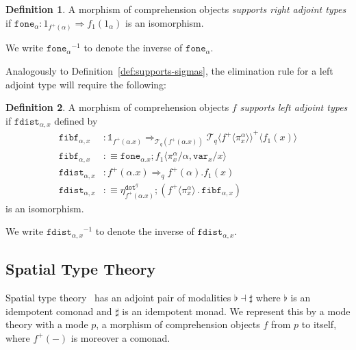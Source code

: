 \documentclass[10pt]{article}
\theoremstyle{definition}
\newtheorem{definition}{Definition}
\let\emptyset\varnothing
\newcommand{\tcell}{\Rightarrow}
\newcommand\TrPlus[2]{\ensuremath{{#1}^+(#2)}}
\newcommand\El[2]{\mathcal{T}_{#1}(#2)}
\newcommand\ApEl[2]{\mathcal{T}_{#1}\langle#2\rangle}
\newcommand\bdot[0]{\mathbin{.}}
\newcommand\ap[2]{\ensuremath{#1 \langle #2 \rangle }}
\newcommand\ApPlus[2]{\ensuremath{{#1}^+ \langle #2 \rangle }}
\newcommand{\tdot}{\ensuremath{\mathtt{dot}}}
\newcommand\One{\ensuremath{\mathds{1}}}
\newcommand\var[1]{\ensuremath{\mathtt{var}_{#1}}}
\newcommand\fone[1]{\ensuremath{\mathtt{fone}_{#1}}}
\newcommand\fibf[1]{\ensuremath{\mathtt{fibf}_{#1}}}
\newcommand\foneinv[1]{\ensuremath{\fone{#1}^{-1}}}
\newcommand\fdist[1]{\ensuremath{\mathtt{fdist}_{#1}}}
\newcommand\fdistinv[1]{\ensuremath{\fdist{#1}^{-1}}}
\begin{document}
\begin{definition} \label{def:supports-right-adjoint}
A morphism of comprehension objects \emph{supports right adjoint types}
if $\fone{\alpha} : 1_{\TrPlus{f}{\alpha}} \tcell f_1(1_\alpha)$ is an isomorphism.
\end{definition}
We write $\foneinv{\alpha}$ to denote the inverse of $\fone{\alpha}$.

Analogously to Definition~\ref{def:supports-sigmas}, the elimination
rule for a left adjoint type will require the following:

\begin{definition} \label{def:supports-left}
A morphism of comprehension objects $f$ \emph{supports left adjoint types} if $\fdist{\alpha, x}$ defined by
\begin{align*}
\fibf{\alpha, x} &: \One_{\TrPlus{f}{\alpha.x}} \tcell_{\El{q}{\TrPlus{f}{\alpha.x}}} \ApPlus{\ApEl{q}{\ApPlus{f}{\pi^\alpha_x}}}{f_1(x)} \\
\fibf{\alpha, x} &:\equiv \fone{\alpha.x};\ap{f_1}{\pi^\alpha_x/\alpha, \var{x}/x} \\
\fdist{\alpha, x} &: \TrPlus{f}{\alpha.x} \tcell_q \TrPlus{f}{\alpha}.f_1(x) \\
\fdist{\alpha, x} &:\equiv \eta^{\tdot^q}_{\TrPlus{f}{\alpha.x}} ; (\ApPlus{f}{\pi^\alpha_x} \bdot \fibf{\alpha, x})
\end{align*}
is an isomorphism.
\end{definition}
We write $\fdistinv{\alpha,x}$ to denote the inverse of $\fdist{\alpha,x}$.


\subsection{Spatial Type Theory}

Spatial type theory~\citep{shulman15realcohesion} has an adjoint pair of
modalities $\flat \dashv \sharp$ where $\flat$ is an idempotent comonad
and $\sharp$ is an idempotent monad.  We represent this by a mode theory
with a mode $p$, a morphism of comprehension objects $f$ from $p$ to
itself, where $\TrPlus{f}{-}$ is moreover a comonad.
\end{document}
